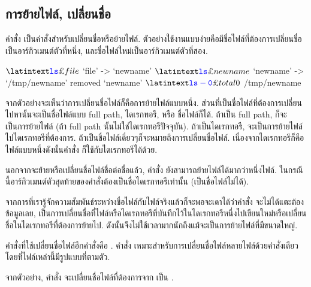 \begin{thwbr}
\subsection{การย้ายไฟล์, เปลี่ยนชื่อ}
คำสั่ง  เป็นคำสั่งสำหรับเปลี่ยนชื่อหรือย้ายไฟล์.
ตัวอย่างใช้งานแบบง่ายคือมีชื่อไฟล์ที่ต้องการเปลี่ยนชื่อเป็นอาร์กิวเมนต์ตัวที่หนึ่ง, และชื่อไฟล์ใหม่เป็นอาร์กิวเมนต์ตัวที่สอง. 
\begin{MyExample}
\begin{MyEx}
$ \cin{ls}
file
$ 
`file' -> `newname'
$ \cin{ls}
newname
$  
`newname' -> `/tmp/newname'
removed `newname'
$ \cin{ls -0}
total 0
$ 
/tmp/newname
\end{MyEx}
\end{MyExample}%

จากตัวอย่างจะเห็นว่าการเปลี่ยนชื่อไฟล์ก็คือการย้ายไฟล์แบบหนึ่ง. ส่วนที่เป็นชื่อไฟล์ที่ต้องการเปลี่ยนไปหานั้นจะเป็นชื่อไฟล์แบบ full path, ไดเรกทอรี, หรือ ชื่อไฟล์ก็ได้. ถ้าเป็น full path, ก็จะเป็นการย้ายไฟล์ (ถ้า full path นั้นไม่ใช่ไดเรกทอรีปัจจุบัน). ถ้าเป็นไดเรกทอรี, จะเป็นการย้ายไฟล์ไปไดเรกทอรีที่ต้องการ. ถ้าเป็นชื่อไฟล์เดี่ยวๆก็จะหมายถึงการเปลี่ยนชื่อไฟล์. เนื่องจากไดเรกทอรีก็คือไฟล์แบบหนึ่งดังนั้นคำสั่ง  ก็ใช้กับไดเรกทอรีได้ด้วย. 

นอกจากจะย้ายหรือเปลี่ยนชื่อไฟล์ชื่อต่อชื่อแล้ว, คำสั่ง  ยังสามารถย้ายไฟล์ได้มากว่าหนึ่งไฟล์. ในกรณีนี้อาร์กิวเมนต์ตัวสุดท้ายของคำสั่งต้องเป็นชื่อไดเรกทอรีเท่านั้น (เป็นชื่อไฟล์ไม่ได้).

จากการที่เรารู้จักความสัมพันธ์ระหว่างชื่อไฟล์กับไฟล์จริงแล้วก็จะพอจะเดาได้ว่าคำสั่ง  จะไม่ได้แตะต้องข้อมูลเลย, เป็นการเปลี่ยนชื่อที่ไฟล์หรือไดเรกทอรีที่บันทึกไว้ในไดเรกทอรีหนึ่งไปเขียนใหม่หรือเปลี่ยนชื่อในไดเรกทอรีที่ต้องการย้ายไป. ดังนั้นจึงไม่ใช้เวลามากนักถึงแม้จะเป็นการย้ายไฟล์ที่มีขนาดใหญ่.

คำสั่งที่ใช้เปลี่ยนชื่อไฟล์อีกคำสั่งคือ .
คำสั่ง  เหมาะสำหรับการเปลี่ยนชื่อไฟล์หลายไฟล์ด้วยคำสั่งเดียวโดยที่ไฟล์เหล่านี้มีรูปแบบที่ตามตัว. 
\begin{MyExample}
\end{MyExample}%
จากตัวอย่าง, คำสั่ง  จะเปลี่ยนชื่อไฟล์ที่ต้องการจาก  เป็น .



\end{thwbr}
